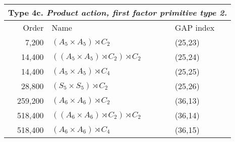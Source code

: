 \begin{center}
{\vskip1cm

  \begin{tabular}{r|l|l}
  \multicolumn{3}{c}{Type 4c. \emph{Product action, first factor primitive type 2.}}\\\toprule
    Order & Name & GAP index \\
\midrule
 7,200 & $(A_5 \times A_5) \rtimes C_2$ & (25,23) \\
 14,400 & $((A_5 \times A_5) \rtimes C_2) \rtimes C_2$ & (25,24) \\
 14,400 & $(A_5 \times A_5) \rtimes C_4$ & (25,25) \\
 28,800 & $(S_5 \times S_5) \rtimes C_2$ & (25,26) \\
 259,200 & $(A_6 \times A_6) \rtimes C_2$ & (36,13) \\
 518,400 & $((A_6 \times A_6) \rtimes C_2) \rtimes C_2$ & (36,14) \\
 518,400 & $(A_6 \times A_6) \rtimes C_4$ & (36,15)\\
\end{tabular}
}



\end{center}
